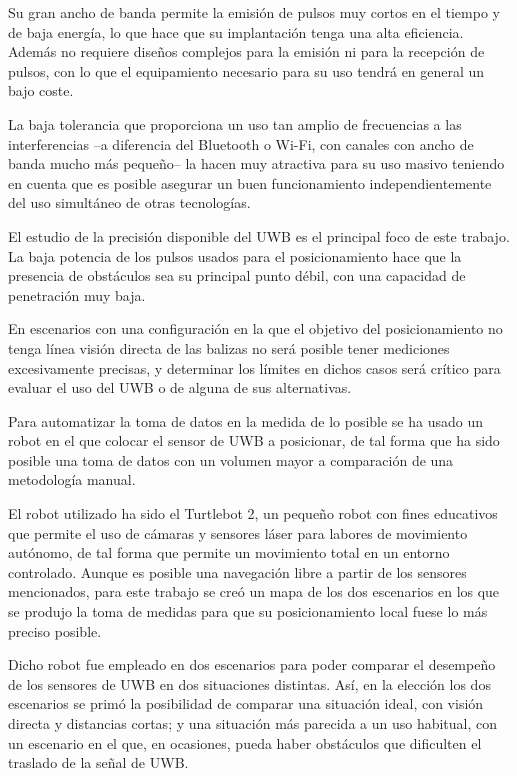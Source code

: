 Su gran ancho de banda permite la emisión de pulsos muy cortos en el tiempo y de baja energía, lo que hace que su implantación tenga una alta eficiencia.
Además no requiere diseños complejos para la emisión ni para la recepción de pulsos, con lo que el equipamiento necesario para su uso tendrá en general un bajo coste.

La baja tolerancia que proporciona un uso tan amplio de frecuencias a las interferencias --a diferencia del Bluetooth o Wi-Fi, con canales con ancho de banda mucho más pequeño-- la hacen muy atractiva para su uso masivo teniendo en cuenta que es posible asegurar un buen funcionamiento independientemente del uso simultáneo de otras tecnologías.

El estudio de la precisión disponible del UWB es el principal foco de este trabajo.
La baja potencia de los pulsos usados para el posicionamiento hace que la presencia de obstáculos sea su principal punto débil, con una capacidad de penetración muy baja.

En escenarios con una configuración en la que el objetivo del posicionamiento no tenga línea visión directa de las balizas no será posible tener mediciones excesivamente precisas, y determinar los límites en dichos casos será crítico para evaluar el uso del UWB o de alguna de sus alternativas.

Para automatizar la toma de datos en la medida de lo posible se ha usado un robot en el que colocar el sensor de UWB a posicionar, de tal forma que ha sido posible una toma de datos con un volumen mayor a comparación de una metodología manual.

El robot utilizado ha sido el Turtlebot 2, un pequeño robot con fines educativos que permite el uso de cámaras y sensores láser para labores de movimiento autónomo, de tal forma que permite un movimiento total en un entorno controlado.
Aunque es posible una navegación libre a partir de los sensores mencionados, para este trabajo se creó un mapa de los dos escenarios en los que se produjo la toma de medidas para que su posicionamiento local fuese lo más preciso posible.

Dicho robot fue empleado en dos escenarios para poder comparar el desempeño de los sensores de UWB en dos situaciones distintas.
Así, en la elección los dos escenarios se primó la posibilidad de comparar una situación ideal, con visión directa y distancias cortas; y una situación más parecida a un uso habitual, con un escenario en el que, en ocasiones, pueda haber obstáculos que dificulten el traslado de la señal de UWB.

